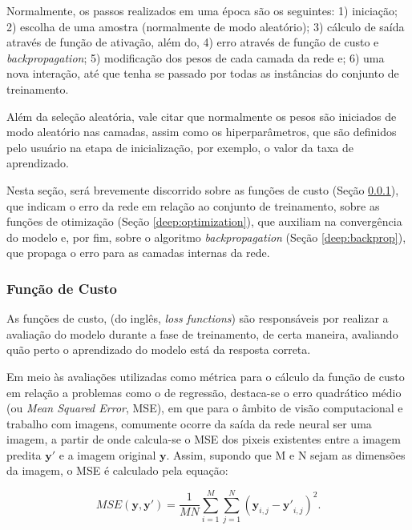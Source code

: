 Normalmente, os passos realizados em uma época são os seguintes: 1) iniciação; 2) escolha de uma amostra (normalmente de modo aleatório); 3) cálculo de saída através de função de ativação, além do, 4) erro através de função de custo e \textit{backpropagation}; 5) modificação dos pesos de cada camada da rede e; 6) uma nova interação, até que tenha se passado por todas as instâncias do conjunto de treinamento.

Além da seleção aleatória, vale citar que normalmente os pesos são iniciados de modo aleatório nas camadas, assim como os hiperparâmetros, que são definidos pelo usuário na etapa de inicialização, por exemplo, o valor da taxa de aprendizado.

Nesta seção, será brevemente discorrido sobre as funções de custo (Seção \ref{deep:cust}), que indicam o erro da rede em relação ao conjunto de treinamento, sobre as funções de otimização (Seção \ref{deep:optimization}), que auxiliam na convergência do modelo e, por fim, sobre o algoritmo \textit{backpropagation} (Seção \ref{deep:backprop}), que propaga o erro para as camadas internas da rede.


\subsubsection{Função de Custo}
\label{deep:cust}

As funções de custo, (do inglês, \textit{loss functions}) são responsáveis por realizar a avaliação do modelo durante a fase de treinamento, de certa maneira, avaliando quão perto o aprendizado do modelo está da resposta correta.

Em meio às avaliações utilizadas como métrica para o cálculo da função de custo em relação a problemas como o de regressão, destaca-se o erro quadrático médio (ou \textit{Mean Squared Error}, MSE)\cite{Wang2004}, em que para o âmbito de visão computacional e trabalho com imagens, comumente ocorre da saída da rede neural ser uma imagem, a partir de onde calcula-se o MSE dos pixeis existentes entre a imagem predita $\boldsymbol{y'}$ e a imagem original $\boldsymbol{y}$. Assim, supondo que M e N sejam as dimensões da imagem, o MSE é calculado pela equação:

\begin{equation}
    \label{deep:eq:9}
    MSE(\boldsymbol{y}, \boldsymbol{y'}) = \frac{1}{MN} \sum_{i=1}^{M} \sum_{j=1}^{N} (\boldsymbol{y}_{i,j} - \boldsymbol{y'}_{i,j})^2.
\end{equation}

